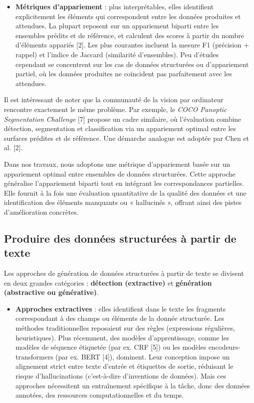 \begin{itemize}
\item \textbf{Métriques d’appariement} : plus interprétables, elles identifient explicitement les éléments qui correspondent entre les données produites et attendues. La plupart reposent sur un appariement biparti entre les ensembles prédits et de référence, et calculent des scores à partir du nombre d’éléments appariés [2]. Les plus courantes incluent la mesure F1 (précision + rappel) et l’indice de Jaccard (similarité d’ensembles). Peu d’études cependant se concentrent sur les cas de données structurées ou d’appariement partiel, où les données produites ne coïncident pas parfaitement avec les attendues.
\end{itemize}

Il est intéressant de noter que la communauté de la vision par ordinateur rencontre exactement le même problème. Par exemple, le \emph{COCO Panoptic Segmentation Challenge} [7] propose un cadre similaire, où l’évaluation combine détection, segmentation et classification via un appariement optimal entre les surfaces prédites et de référence. Une démarche analogue est adoptée par Chen et al. [2].

Dans nos travaux, nous adoptons une métrique d’appariement basée sur un appariement optimal entre ensembles de données structurées. Cette approche généralise l’appariement biparti tout en intégrant les correspondances partielles. Elle fournit à la fois une évaluation quantitative de la qualité des données et une identification des éléments manquants ou « hallucinés », offrant ainsi des pistes d’amélioration concrètes.

\subsection{Produire des données structurées à partir de texte}

Les approches de génération de données structurées à partir de texte se divisent en deux grandes catégories : \textbf{détection (extractive)} et \textbf{génération (abstractive ou générative)}.

\begin{itemize}
\item \textbf{Approches extractives} : elles identifient dans le texte les fragments correspondant à des champs ou éléments de la donnée structurée. Les méthodes traditionnelles reposaient sur des règles (expressions régulières, heuristiques). Plus récemment, des modèles d’apprentissage, comme les modèles de séquence étiquetée (par ex. CRF [5]) ou les modèles encodeurs-transformers (par ex. BERT [4]), dominent. Leur conception impose un alignement strict entre texte d’entrée et étiquettes de sortie, réduisant le risque d’hallucinations (c’est-à-dire d’inventions de données). Mais ces approches nécessitent un entraînement spécifique à la tâche, donc des données annotées, des ressources computationnelles et du temps.
\end{itemize}

